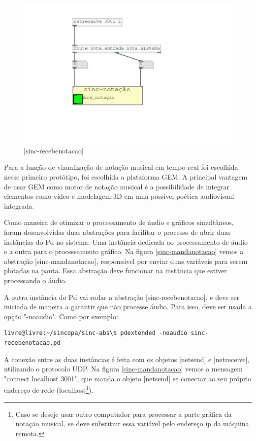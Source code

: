 \documentclass{ppgmus}
\begin{document}
\begin{figure}[!ht]
\includegraphics[scale=.6]{sinc-recebenotacao}
\caption{[sinc-recebenotacao]}
\label{sinc-recebenotacao}
\end{figure} 

Para a função de vizualização de notação musical
em tempo-real foi escolhida nesse primeiro protótipo, foi escolhida a plataforma GEM.
A principal vantagem de usar GEM como motor de notação musical é a possibilidade
de integrar elementos como vídeo e modelagem 3D em uma possível poética audiovisual integrada.

Como maneira de otimizar o processamento de áudio e gráficos simultâneos, foram desenvolvidas
 duas abstrações para facilitar o processo de abrir duas instâncias do Pd no sistema. Uma instância dedicada
ao processamento de áudio e a outra para o processamento gráfico.
Na figura \ref{sinc-mandanotacao} vemos a abstração [sinc-mandanotacao], responsável por enviar duas variáveis
para serem plotadas na pauta. Essa abstração deve funcionar na instância que estiver processando o áudio.

A outra instância do Pd vai rodar a abstração [sinc-recebenotacao], e deve ser iniciada de maneira a garantir 
que não processe áudio. Para isso, deve ser usada a opção "-noaudio".
Como por exemplo:

\begin{verbatim}
livre@livre:~/sincopa/sinc-abs\$ pdextended -noaudio sinc-recebenotacao.pd 
\end{verbatim} 

A conexão entre as duas instâncias é feita com os objetos [netsend] e [netreceive], utilizando o protocolo
UDP. Na figura \ref{sinc-mandanotacao} vemos a mensagem "connect localhost 3001", que manda o objeto
[netsend] se conectar ao seu próprio endereço de rede (localhost\footnote{Caso se deseje usar outro computador
para processar a parte gráfica da notação musical, se deve substituir essa variável pelo endereço ip da máquina remota.}).
\end{document}
